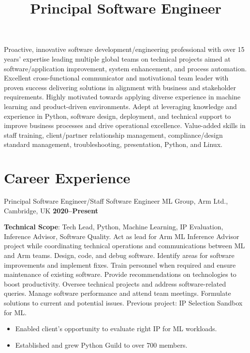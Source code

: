 \documentclass[10pt,a4paper,sans]{moderncv}
\title{Principal Software Engineer}
\begin{document}
\maketitle
Proactive, innovative software development/engineering
professional with over 15 years’ expertise leading multiple global teams on
technical projects aimed at software/application improvement, system
enhancement, and process automation. Excellent cross-functional communicator
and motivational team leader with proven success delivering solutions in
alignment with business and stakeholder requirements. Highly motivated towards
applying diverse experience in machine learning and product-driven
environments. Adept at leveraging knowledge and experience in Python, software
design, deployment, and technical support to improve business processes and
drive operational excellence. Value-added skills in staff training,
client/partner relationship management, compliance/design standard management,
troubleshooting, presentation, Python, and Linux.

\section{Career Experience}


\cventry{}
    {Principal Software Engineer/Staff Software Engineer}
    {ML Group, Arm Ltd., Cambridge, UK}
    {\textbf{2020--Present}}
    {}
    {\textbf{Technical Scope}: Tech Lead, Python, Machine Learning, IP
    Evaluation, Inference Advisor, Software Quality.\newline
    Act as lead for Arm ML Inference Advisor project while
    coordinating technical operations and communications between ML and Arm
    teams. Design, code, and debug software. Identify areas for software
    improvements and implement fixes.
    Train personnel when required and ensure maintenance of existing
    software. Provide recommendations on technologies to boost productivity.
    Oversee technical projects and address software-related queries. Manage
    software performance and attend team meetings. Formulate solutions to
    current and potential issues.
    Previous project: IP Selection Sandbox for ML\@.
    \begin{itemize}
        \item Enabled client’s opportunity to evaluate right IP for ML
            workloads.
        \item Established and grew Python Guild to over 700 members.
    \end{itemize}}
\end{document}
